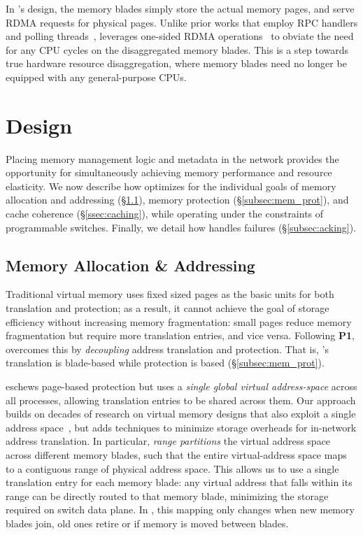 In \mind's design, the memory blades simply store the actual memory pages, and serve RDMA requests for physical pages. Unlike prior works that employ RPC handlers and polling threads~\cite{legoos}, \mind leverages one-sided RDMA operations~\cite{farm} to obviate the need for any CPU cycles on the disaggregated memory blades. This is a step towards true hardware resource disaggregation, where memory blades need no longer be equipped with any general-purpose CPUs.

\section{\mind Design}
\label{sec:minddesign}

Placing memory management logic and metadata in the network provides the opportunity for simultaneously achieving memory performance and resource elasticity. We now describe how \mind optimizes for the individual goals of memory allocation and addressing (\S\ref{subsec:addr_trans}), memory protection (\S\ref{subsec:mem_prot}), and cache coherence (\S\ref{ssec:caching}), while operating under the constraints of programmable switches. Finally, we detail how \mind handles failures (\S\ref{subsec:acking}). %

\subsection{Memory Allocation \& Addressing}
\label{subsec:addr_trans}

Traditional virtual memory uses fixed sized pages as the basic units for both translation and protection; as a result, it cannot achieve the goal of storage efficiency without increasing memory fragmentation: small pages reduce memory fragmentation but require more translation entries, and vice versa.  Following \textbf{P1}, \mind overcomes this by \textit{decoupling} address translation and protection.  That is, \mind's translation is blade-based while protection is  based (\S\ref{subsec:mem_prot}).

 \mind eschews page-based protection but uses a \textit{single global virtual address-space} across all processes, allowing translation entries to be shared across them. Our approach builds on decades of research on virtual memory designs that also exploit a single address space~\cite{cheri, cap, gam, grappa, opal}, but adds techniques to minimize storage overheads for in-network address translation.
In particular, \mind \textit{range partitions} the virtual address space across different memory blades, such that the entire virtual-address space maps to a contiguous range of physical address space. This allows us to use a single translation entry for each memory blade: any virtual address that falls within its range can be directly routed to that memory blade, minimizing the storage required on switch data plane. In \mind, this mapping only changes when new memory blades join, old ones retire or if memory is moved between blades.

